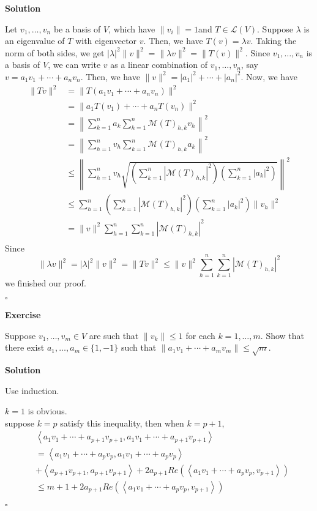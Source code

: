 \documentclass{article}
\newenvironment{exercise}{%
{\textbf{Exercise\\}
    }
}{
}
\newenvironment{solution}{%
{
    \textbf{Solution\\}
    }
}{
  \hfill $\square$ 
  \par\bigskip 
}
\newcommand{\parameter}[1]{\left(#1\right)}
\begin{document}
\begin{CJK}{UTF8}{gkai}
\begin{solution}
    Let $v_1,\ldots,v_n$ be a basis of $V$, which have $\|v_i\| = 1$and $T \in \mathcal{L}(V)$. Suppose $\lambda$ is an eigenvalue of $T$ with eigenvector $v$. Then, we have $T(v) = \lambda v$. Taking the norm of both sides, we get $|\lambda|^2 \|v\|^2 = \|\lambda v\|^2 = \|T(v)\|^2$. Since $v_1,\ldots,v_n$ is a basis of $V$, we can write $v$ as a linear combination of $v_1,\ldots,v_n$, say $v = a_1v_1 + \cdots + a_nv_n$. Then, we have $\|v\|^2 = |a_1|^2 + \cdots + |a_n|^2$. Now, we have
\begin{align*}
\|Tv\|^2 &= \|T(a_1v_1 + \cdots + a_nv_n)\|^2 \\
&= \|a_1T(v_1) + \cdots + a_nT(v_n)\|^2 \\
&=\left\| \sum_{k = 1}^{n} a_k \sum_{h = 1}^{n}\mathcal{M}(T)_{h,k} v_h\right\|^2 \\
&=\left\| \sum_{h = 1}^{n}  v_h\sum_{k = 1}^{n} \mathcal{M}(T)_{h,k}a_k \right\|^2 \\
&\leq\left\| \sum_{h = 1}^{n}  v_h\sqrt{\parameter{\sum_{k = 1}^{n} |\mathcal{M}(T)_{h,k}|^2}\parameter{\sum_{k = 1}^{n} | a_k|^2}} \right\|^2 \\
&\leq \sum_{h = 1}^{n}\parameter{\sum_{k = 1}^{n} |\mathcal{M}(T)_{h,k}|^2}\parameter{\sum_{k = 1}^{n} | a_k|^2}  \|v_h\|^2  \\
&= \|v\|^2 \sum_{h = 1}^{n}\sum_{k = 1}^{n}|\mathcal{M}(T)_{h,k}|^2\\
\end{align*}
Since
\[\|\lambda v\|^2 = |\lambda|^2 \|v\|^2 = \|Tv\|^2 \leq  \|v\|^2 \sum_{h = 1}^{n}\sum_{k = 1}^{n}|\mathcal{M}(T)_{h,k}|^2\]
we finished our proof.
\end{solution}

\begin{exercise}
    Suppose $v_1,\ldots,v_m \in V$ are such that $\|v_k\| \leq 1$ for each $k = 1,\ldots,m$. Show that there exist $a_1,\ldots,a_m \in \{1,-1\}$ such that $\|a_1v_1 + \cdots+a_mv_m\| \leq \sqrt{m}$.   
\end{exercise}

\begin{solution}
    Use induction.

    $k = 1$ is obvious.\\

    suppose $k = p$ satisfy this inequality, then when $k = p + 1$,
    \[
    \begin{aligned}
        &\left<a_1v_1 + \cdots+a_{p + 1}v_{p + 1},a_1v_1 + \cdots+a_{p +1}v_{p + 1}\right>\\
        &=\left<a_1v_1 + \cdots+a_{p}v_{p},a_1v_1 + \cdots+a_{p}v_{p}\right> \\
        &+ \left<a_{p + 1}v_{p + 1},a_{p +1}v_{p + 1}\right> + 2a_{p +1} Re(\left<a_1v_1 + \cdots+a_{p}v_{p},v_{p + 1}\right>) \\
        &\leq m + 1 + 2a_{p +1} Re(\left<a_1v_1 + \cdots+a_{p}v_{p},v_{p + 1}\right>)
    \end{aligned} 
    \]


\end{solution}
\end{CJK}
\end{document}
